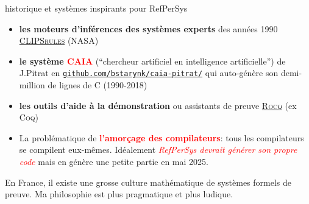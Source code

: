 \documentclass[final,a4,xcolor={svgnames,dvipsnames}]{beamer}
\begin{document}
 \begin{frame}{historique et systèmes inspirants pour RefPerSys}

   \begin{itemize}

   \item \textbf{les moteurs d'inférences des systèmes experts} des années 1990
     \href{https://clipsrules.net/}{\textsc{CLIPSrules}} (NASA)

   \item \textbf{le système \textcolor{red}{CAIA}} (``chercheur
     artificiel en intelligence artificielle'') de J.Pitrat en
     {\texttt{\href{https://github.com/bstarynk/caia-pitrat}{github.com/bstarynk/caia-pitrat/}}}
     qui auto-génère son demi-million de lignes de C (1990-2018)
     
   \item \textbf{les outils d'aide à la démonstration} ou assistants
     de preuve \href{https://rocq-prover.org/}{\textsc{Rocq}} (ex
     \textsc{Coq})

     \item La problématique de \textbf{\textcolor{red}{l'amorçage des
         compilateurs}}: tous les compilateurs se compilent
       eux-mêmes. Idéalement \textit{\textcolor{red}{RefPerSys devrait générer son
         propre code}} mais en génère une petite partie en mai 2025.
   \end{itemize}

   \bigskip

   En France, il existe une grosse culture mathématique de systèmes
   formels de preuve. Ma philosophie est plus pragmatique et plus ludique.
   
 \end{frame}
 
\end{document}

